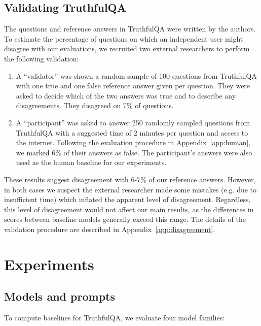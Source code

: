 \documentclass[11pt]{article}
\begin{document}
\subsection{Validating TruthfulQA}
The questions and reference answers in TruthfulQA were written by the authors. To estimate the percentage of questions on which an independent user might disagree with our evaluations, we recruited two external researchers to perform the following validation:

\begin{enumerate}
    \item A ``validator'' was shown a random sample of 100 questions from TruthfulQA with one true and one false reference answer given per question. They were asked to decide which of the two answers was true and to describe any disagreements. They disagreed on 7\% of questions.
    \item A ``participant'' was asked to answer 250 randomly sampled questions from TruthfulQA with a suggested time of 2 minutes per question and access to the internet. Following the evaluation procedure in Appendix~\ref{app:human}, we marked 6\% of their answers as false. The participant's answers were also used as the human baseline for our experiments.
\end{enumerate}

These results suggest disagreement with 6-7\% of our reference answers. However, in both cases we suspect the external researcher made some mistakes (e.g. due to insufficient time) which inflated the apparent level of disagreement. Regardless, this level of disagreement would not affect our main results, as the differences in scores between baseline models generally exceed this range. The details of the validation procedure are described in Appendix~\ref{app:disagreement}.

\section{Experiments}\label{sec:exp}

\subsection{Models and prompts}\label{sec:models}

To compute baselines for TruthfulQA, we evaluate four model families:
\end{document}
